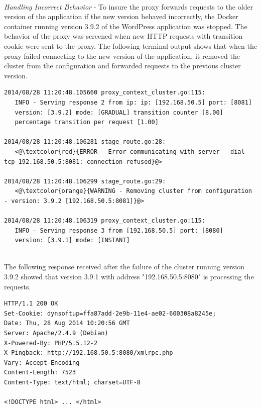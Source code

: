 \documentclass[a4paper,11pt,twoside]{report}
\begin{document}
\noindent\\
\textit{Handling Incorrect Behavior} - To insure the proxy forwards requests to the older version of the application if the new version behaved incorrectly, the Docker container running version 3.9.2 of the WordPress application was stopped. The behavior of the proxy was screened when new HTTP requests with transition cookie were sent to the proxy. The following terminal output shows that when the proxy failed connecting to the new version of the application, it removed the cluster from the configuration and forwarded requests to the previous cluster version. \smallskip

\begin{lstlisting}[language=terminal]
2014/08/28 11:20:48.105660 proxy_context_cluster.go:115:     
   INFO - Serving response 2 from ip: ip: [192.168.50.5] port: [8081] 
   version: [3.9.2] mode: [GRADUAL] transition counter [8.00] 
   percentage transition per request [1.00]
   
2014/08/28 11:20:48.106281 stage_route.go:28:    
   <@\textcolor{red}{ERROR - Error communicating with server - dial tcp 192.168.50.5:8081: connection refused}@>

2014/08/28 11:20:48.106299 stage_route.go:29:  
   <@\textcolor{orange}{WARNING - Removing cluster from configuration - version: 3.9.2 [192.168.50.5:8081]}@>

2014/08/28 11:20:48.106319 proxy_context_cluster.go:115:     
   INFO - Serving response 3 from [192.168.50.5] port: [8080] 
   version: [3.9.1] mode: [INSTANT]
\end{lstlisting}   

\noindent\\
The following response received after the failure of the cluster running version 3.9.2 showed that version 3.9.1 with address "192.168.50.5:8080" is processing the requests.\smallskip

\begin{lstlisting}[language=terminal]
HTTP/1.1 200 OK
Set-Cookie: dynsoftup=ffa87add-2e9b-11e4-ae02-600308a8245e;
Date: Thu, 28 Aug 2014 10:20:56 GMT
Server: Apache/2.4.9 (Debian)
X-Powered-By: PHP/5.5.12-2
X-Pingback: http://192.168.50.5:8080/xmlrpc.php
Vary: Accept-Encoding
Content-Length: 7523
Content-Type: text/html; charset=UTF-8
 
<!DOCTYPE html> ... </html>
\end{lstlisting}     
\end{document}
